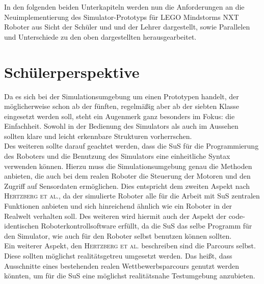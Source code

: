 \documentclass[paper=a4, pagesize, DIV=calc, BCOR=12.5mm, twoside=on, onecolumn=on, open = any, titlepage =on, parskip =half-, headsepline = on, footsepline = on, chapterprefix = on, appendixprefix = off, fontsize = 12pt, numbers = noenddot, abstract = on]{scrbook}
\numberwithin{equation}{chapter}
\theoremstyle{definition}
\theoremstyle{plain}
\theoremstyle{plain}
\theoremstyle{remark}
\theoremstyle{plain}
\theoremstyle{plain}
\begin{document}
In den folgenden beiden Unterkapiteln werden nun die Anforderungen an die Neuimplementierung des Simulator-Prototyps für LEGO Mindstorms NXT Roboter aus Sicht der Schüler und und der Lehrer dargestellt, sowie Parallelen und Unterschiede zu den oben dargestellten herausgearbeitet.

\par \singlespacing
\section{Schülerperspektive}
\label{sec:schüler}
\onehalfspacing
Da es sich bei der Simulationsumgebung um einen Prototypen handelt, der möglicherweise schon ab der fünften, regelmäßig aber ab der siebten Klasse eingesetzt werden soll, steht ein Augenmerk ganz besonders im Fokus: die Einfachheit. Sowohl in der Bedienung des Simulators als auch im Aussehen sollten klare und leicht erkennbare Strukturen vorherrschen.\\

Des weiteren sollte darauf geachtet werden, dass die SuS für die Programmierung des Roboters und die Benutzung des Simulators eine einheitliche Syntax verwenden können. Hierzu muss die Simulationsumgebung genau die Methoden anbieten, die auch bei dem realen Roboter die Steuerung der Motoren und den Zugriff auf Sensordaten ermöglichen. Dies entspricht dem zweiten Aspekt nach \textsc{Hertzberg et al.}, da der simulierte Roboter alle für die Arbeit mit SuS zentralen Funktionen anbieten und sich hinreichend ähnlich wie ein Roboter in der Realwelt verhalten soll. Des weiteren wird hiermit auch der Aspekt der code-identischen Roboterkontrollsoftware erfüllt, da die SuS das selbe Programm für den Simulator, wie auch für den Roboter selbst benutzen können sollten.\\

Ein weiterer Aspekt, den \textsc{Hertzberg et al.} beschreiben sind die Parcours selbst. Diese sollten möglichst realitätsgetreu umgesetzt werden. Das heißt, dass Ausschnitte eines bestehenden realen Wettbewerbsparcours genutzt werden könnten, um für die SuS eine möglichst realitätsnahe Testumgebung anzubieten.\\
\par \singlespacing
\end{document}
